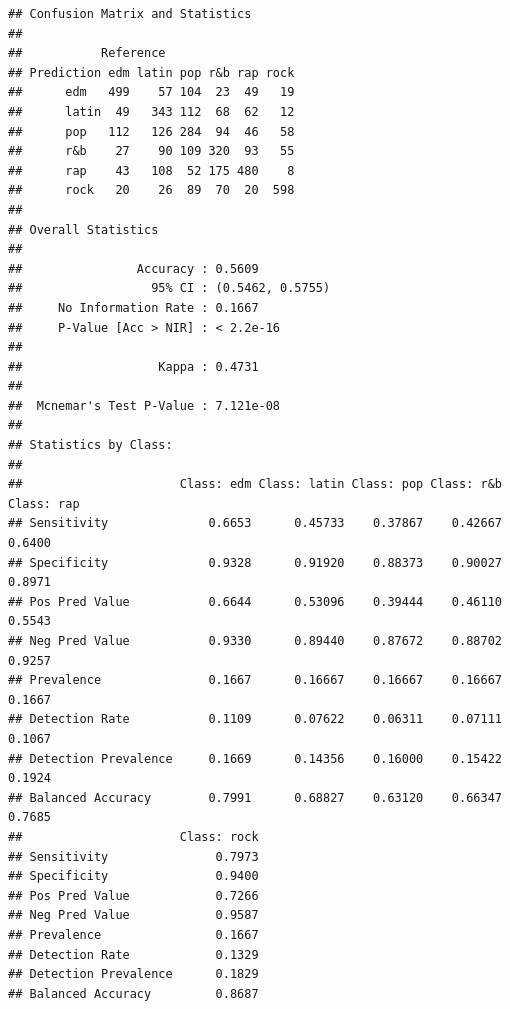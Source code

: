 \documentclass[
]{article}
\newenvironment{Shaded}{\begin{snugshade}}{\end{snugshade}}
\newcommand{\FunctionTok}[1]{\textcolor[rgb]{0.00,0.00,0.00}{#1}}
\newcommand{\NormalTok}[1]{#1}
\newcommand{\OtherTok}[1]{\textcolor[rgb]{0.56,0.35,0.01}{#1}}
\newcommand{\SpecialCharTok}[1]{\textcolor[rgb]{0.00,0.00,0.00}{#1}}
\begin{document}
\begin{Shaded}
\end{Shaded}

\begin{verbatim}
## Confusion Matrix and Statistics
## 
##           Reference
## Prediction edm latin pop r&b rap rock
##      edm   499    57 104  23  49   19
##      latin  49   343 112  68  62   12
##      pop   112   126 284  94  46   58
##      r&b    27    90 109 320  93   55
##      rap    43   108  52 175 480    8
##      rock   20    26  89  70  20  598
## 
## Overall Statistics
##                                           
##                Accuracy : 0.5609          
##                  95% CI : (0.5462, 0.5755)
##     No Information Rate : 0.1667          
##     P-Value [Acc > NIR] : < 2.2e-16       
##                                           
##                   Kappa : 0.4731          
##                                           
##  Mcnemar's Test P-Value : 7.121e-08       
## 
## Statistics by Class:
## 
##                      Class: edm Class: latin Class: pop Class: r&b Class: rap
## Sensitivity              0.6653      0.45733    0.37867    0.42667     0.6400
## Specificity              0.9328      0.91920    0.88373    0.90027     0.8971
## Pos Pred Value           0.6644      0.53096    0.39444    0.46110     0.5543
## Neg Pred Value           0.9330      0.89440    0.87672    0.88702     0.9257
## Prevalence               0.1667      0.16667    0.16667    0.16667     0.1667
## Detection Rate           0.1109      0.07622    0.06311    0.07111     0.1067
## Detection Prevalence     0.1669      0.14356    0.16000    0.15422     0.1924
## Balanced Accuracy        0.7991      0.68827    0.63120    0.66347     0.7685
##                      Class: rock
## Sensitivity               0.7973
## Specificity               0.9400
## Pos Pred Value            0.7266
## Neg Pred Value            0.9587
## Prevalence                0.1667
## Detection Rate            0.1329
## Detection Prevalence      0.1829
## Balanced Accuracy         0.8687
\end{verbatim}

\begin{Shaded}
\end{Shaded}
\end{document}

